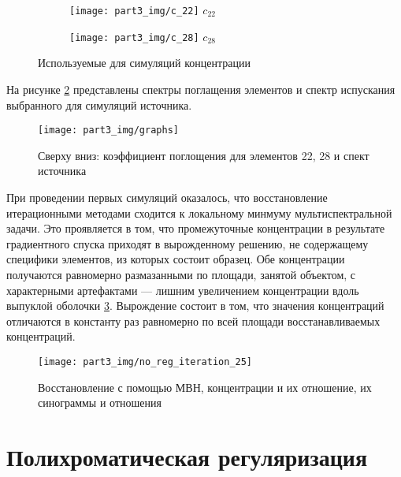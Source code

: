 \begin{figure}
\begin{subfigure}[h]{0.45\textwidth}
  \centering
    \texttt{[image: part3\_img/c\_22]}
  $c_22$
\end{subfigure}
\begin{subfigure}[h]{0.45\textwidth}
  \centering
    \texttt{[image: part3\_img/c\_28]}
  $c_28$
\end{subfigure}
  \caption{Используемые для симуляций концентрации}
\label{fig:white_phantom}
\end{figure}

На рисунке \ref{fig:source} представлены спектры поглащения элементов и спектр испускания выбранного для симуляций источника.

\begin{figure}
  \centering
  \texttt{[image: part3\_img/graphs]}
  \caption{Сверху вниз: коэффициент поглощения для элементов 22, 28 и спект источника}
  \label{fig:source}
\end{figure}

При проведении первых симуляций оказалось, что восстановление итерационными методами сходится к локальному минмуму мультиспектральной задачи.
Это проявляется в том, что промежуточные концентрации в результате градиентного спуска приходят в вырожденному решению, не содержащему специфики элементов, из которых состоит образец.
Обе концентрации получаются равномерно размазанными по площади, занятой объектом, с характерными артефактами --- лишним увеличением концентрации вдоль выпуклой оболочки \ref{fig:wrart_noreg_25}.
Вырождение состоит в том, что значения концентраций отличаются в константу раз равномерно по всей площади восстанавливаемых концентраций.

\begin{figure}
  \centering
  \texttt{[image: part3\_img/no\_reg\_iteration\_25]}
  \caption{Восстановление с помощью МВН, концентрации и их отношение, их синограммы и отношения}
  \label{fig:wrart_noreg_25}
\end{figure}


\section{Полихроматическая регуляризация}

